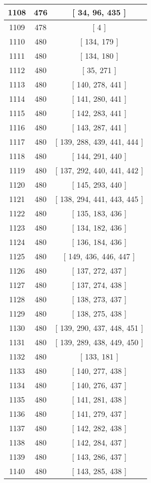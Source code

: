 \begin{center}
\begin{longtable}[H]{|| c c c ||}
1108 & 476 & [ 34, 96, 435 ]
\\\hline
1109 & 478 & [ 4 ]
\\\hline
1110 & 480 & [ 134, 179 ]
\\\hline
1111 & 480 & [ 134, 180 ]
\\\hline
1112 & 480 & [ 35, 271 ]
\\\hline
1113 & 480 & [ 140, 278, 441 ]
\\\hline
1114 & 480 & [ 141, 280, 441 ]
\\\hline
1115 & 480 & [ 142, 283, 441 ]
\\\hline
1116 & 480 & [ 143, 287, 441 ]
\\\hline
1117 & 480 & [ 139, 288, 439, 441, 444 ]
\\\hline
1118 & 480 & [ 144, 291, 440 ]
\\\hline
1119 & 480 & [ 137, 292, 440, 441, 442 ]
\\\hline
1120 & 480 & [ 145, 293, 440 ]
\\\hline
1121 & 480 & [ 138, 294, 441, 443, 445 ]
\\\hline
1122 & 480 & [ 135, 183, 436 ]
\\\hline
1123 & 480 & [ 134, 182, 436 ]
\\\hline
1124 & 480 & [ 136, 184, 436 ]
\\\hline
1125 & 480 & [ 149, 436, 446, 447 ]
\\\hline
1126 & 480 & [ 137, 272, 437 ]
\\\hline
1127 & 480 & [ 137, 274, 438 ]
\\\hline
1128 & 480 & [ 138, 273, 437 ]
\\\hline
1129 & 480 & [ 138, 275, 438 ]
\\\hline
1130 & 480 & [ 139, 290, 437, 448, 451 ]
\\\hline
1131 & 480 & [ 139, 289, 438, 449, 450 ]
\\\hline
1132 & 480 & [ 133, 181 ]
\\\hline
1133 & 480 & [ 140, 277, 438 ]
\\\hline
1134 & 480 & [ 140, 276, 437 ]
\\\hline
1135 & 480 & [ 141, 281, 438 ]
\\\hline
1136 & 480 & [ 141, 279, 437 ]
\\\hline
1137 & 480 & [ 142, 282, 438 ]
\\\hline
1138 & 480 & [ 142, 284, 437 ]
\\\hline
1139 & 480 & [ 143, 286, 437 ]
\\\hline
1140 & 480 & [ 143, 285, 438 ]

\end{longtable}
\end{center}
